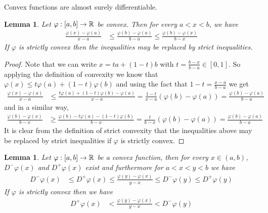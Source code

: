 \documentclass{amsart}
\newtheorem{lem}[thm]{Lemma}
\theoremstyle{remark}
\theoremstyle{definition}
\begin{document}
Convex functions are almost surely differentiable.
\begin{lem}\label{ThreeChordLemma}Let $\varphi : [a,b] \to \mathbb{R}$ be convex.  Then for every
  $a < x < b$, we have
\begin{align*}
\frac{\varphi(x) - \varphi(a)}{x - a} &\leq \frac{\varphi(b) -
  \varphi(a)}{b - a}  \leq \frac{\varphi(b) - \varphi(x)}{b - x} 
\end{align*}
If $\varphi$ is strictly convex then the inequalities may be replaced
by strict inequalities.
\end{lem}
\begin{proof}
Note that we can write $x = t a + (1-t) b$
with $t = \frac{b-x}{b-a} \in [0,1]$.  So applying the definition of
convexity we know that $\varphi(x) \leq t \varphi(a) +
(1-t)\varphi(b)$ and using the fact that $1-t = \frac{x-a}{b-a}$ we get
\begin{align*}
\frac{\varphi(x) - \varphi(a)}{x - a} &\leq \frac{t \varphi(a) +
(1-t)\varphi(b) - \varphi(a)}{x - a} = \frac{1-t}{x-a} (\varphi(b) -
\varphi(a) ) = \frac{\varphi(b) -
  \varphi(a)}{b - a} 
\end{align*}
and in a similar way,
\begin{align*}
\frac{\varphi(b) - \varphi(x)}{b - x} &\geq \frac{ \varphi(b)  - t \varphi(a) -
(1-t)\varphi(b) }{b -x} = \frac{t}{b-x} (\varphi(b) -
\varphi(a) ) = \frac{\varphi(b) -
  \varphi(a)}{b - a} 
\end{align*}
It is clear from the definition of strict convexity that the
inequalities above may be replaced by strict inequalities if $\varphi$ is strictly convex.
\end{proof}
\begin{lem}\label{ConvexHasDini}Let $\varphi : [a,b] \to \mathbb{R}$ be a convex function, then
  for every $x \in (a,b)$, $D^-\varphi(x)$ and $D^+\varphi(x)$ exist
  and furthermore for $a < x < y < b$ we have
\begin{align*}
D^-\varphi(x) &\leq D^+\varphi(x) \leq \frac{\varphi(y) -
  \varphi(x)}{y - x} \leq D^-\varphi(y) \leq D^+\varphi(y)
\end{align*}
If $\varphi$ is strictly convex then we have
\begin{align*}
D^+\varphi(x) &< \frac{\varphi(y) -  \varphi(x)}{y - x} < D^-\varphi(y)
\end{align*}
\end{lem}
\end{document}
